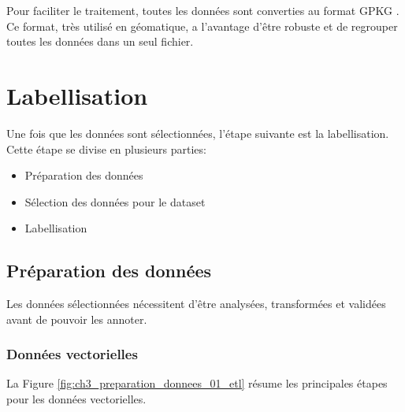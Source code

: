 Pour faciliter le traitement, toutes les données sont converties au format GPKG \cite{noauthor_ogc_nodate}. Ce format, très utilisé en géomatique, a l'avantage d'être robuste et de regrouper toutes les données dans un seul fichier.
\newpage

\section{Labellisation}
Une fois que les données sont sélectionnées, l'étape suivante est la labellisation. Cette étape se divise en plusieurs parties:
\begin{itemize}
    \item Préparation des données
    \item Sélection des données pour le dataset
    \item Labellisation
\end{itemize}

\subsection{Préparation des données}
Les données sélectionnées nécessitent d'être analysées, transformées et validées avant de pouvoir les annoter.

\subsubsection{Données vectorielles}
La Figure \ref{fig:ch3_preparation_donnees_01_etl} résume les principales étapes pour les données vectorielles.

